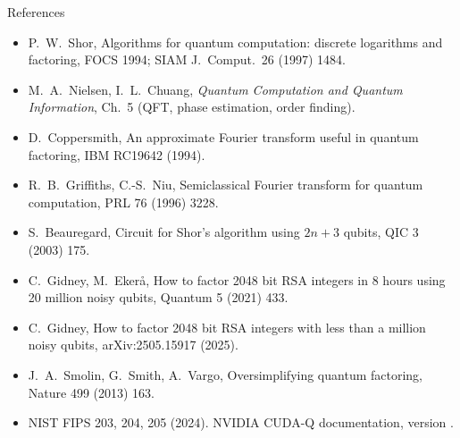 \documentclass[aspectratio=169,11pt]{beamer}
\begin{document}
\begin{frame}{References}
  \scriptsize
  \begin{itemize}\itemsep1pt
    \item P.\ W.\ Shor, Algorithms for quantum computation: discrete logarithms and factoring, FOCS 1994; SIAM J.\ Comput.\ 26 (1997) 1484.
    \item M.\ A.\ Nielsen, I.\ L.\ Chuang, \emph{Quantum Computation and Quantum Information}, Ch.\ 5 (QFT, phase estimation, order finding).
    \item D.\ Coppersmith, An approximate Fourier transform useful in quantum factoring, IBM RC19642 (1994).
    \item R.\ B.\ Griffiths, C.-S.\ Niu, Semiclassical Fourier transform for quantum computation, PRL 76 (1996) 3228.
    \item S.\ Beauregard, Circuit for Shor's algorithm using $2n + 3$ qubits, QIC 3 (2003) 175.
    \item C.\ Gidney, M.\ Ekerå, How to factor 2048 bit RSA integers in 8 hours using 20 million noisy qubits, Quantum 5 (2021) 433.
    \item C.\ Gidney, How to factor 2048 bit RSA integers with less than a million noisy qubits, arXiv:2505.15917 (2025).
    \item J.\ A.\ Smolin, G.\ Smith, A.\ Vargo, Oversimplifying quantum factoring, Nature 499 (2013) 163.
    \item NIST FIPS 203, 204, 205 (2024). NVIDIA CUDA-Q documentation, version \numcudaqversion.
  \end{itemize}
\end{frame}
\end{document}
